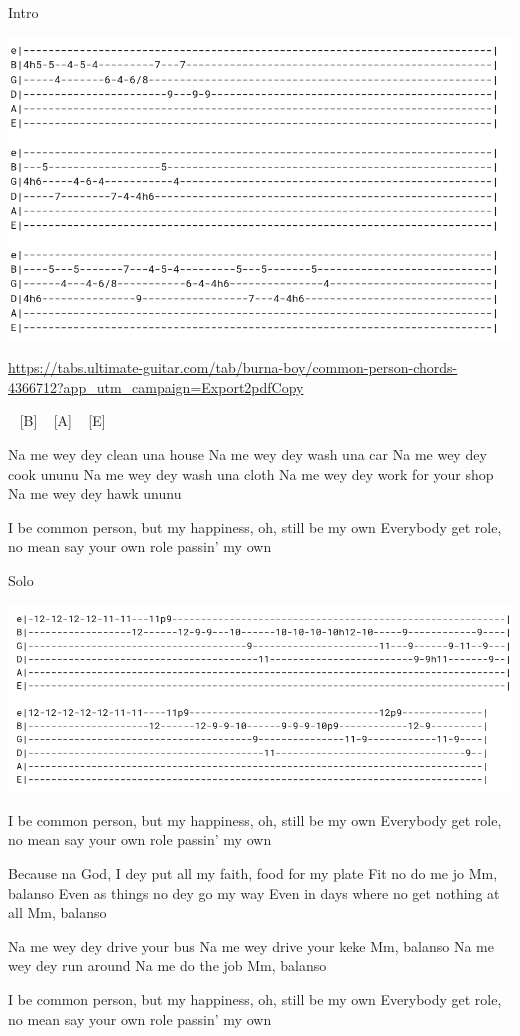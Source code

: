 
Intro

\includegraphics[scale=0.5]{songs/burna_boy_common_person_tab_intro.png}

\url{https://tabs.ultimate-guitar.com/tab/burna-boy/common-person-chords-4366712?app_utm_campaign=Export2pdfCopy}

\begin{guitar}
[E] ~ [B] ~ [A] ~ [E]

Na me wey dey clean una house
Na me wey dey wash una car
Na me wey dey cook ununu
Na me wey dey wash una cloth
Na me wey dey work for your shop
Na me wey dey hawk ununu

I be common person, but my happiness, oh, still be my own
Everybody get role, no mean say your own role passin' my own
\end{guitar}

Solo

\includegraphics[scale=0.5]{songs/burna_boy_common_person_tab_solo.png}

\begin{guitar}
I be common person, but my happiness, oh, still be my own
Everybody get role, no mean say your own role passin' my own

Because na God, I dey put all my faith, food for my plate
Fit no do me jo
Mm, balanso
Even as things no dey go my way
Even in days where no get nothing at all
Mm, balanso

Na me wey dey drive your bus
Na me wey drive your keke
Mm, balanso
Na me wey dey run around
Na me do the job
Mm, balanso

I be common person, but my happiness, oh, still be my own
Everybody get role, no mean say your own role passin' my own
\end{guitar}